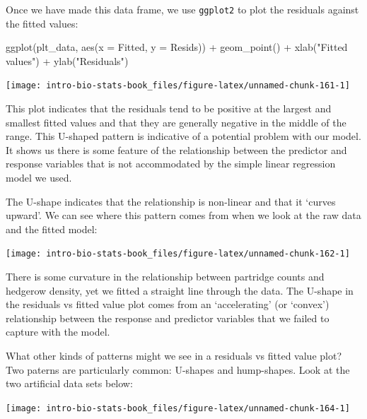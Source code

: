 \documentclass[
]{book}
\newenvironment{Shaded}{\begin{snugshade}}{\end{snugshade}}
\newcommand{\AttributeTok}[1]{\textcolor[rgb]{0.77,0.63,0.00}{#1}}
\newcommand{\FunctionTok}[1]{\textcolor[rgb]{0.00,0.00,0.00}{#1}}
\newcommand{\NormalTok}[1]{#1}
\newcommand{\SpecialCharTok}[1]{\textcolor[rgb]{0.00,0.00,0.00}{#1}}
\newcommand{\StringTok}[1]{\textcolor[rgb]{0.31,0.60,0.02}{#1}}
\begin{document}
Once we have made this data frame, we use \texttt{ggplot2} to plot the residuals against the fitted values:

\begin{Shaded}
\begin{Highlighting}[]
\FunctionTok{ggplot}\NormalTok{(plt\_data, }\FunctionTok{aes}\NormalTok{(}\AttributeTok{x =}\NormalTok{ Fitted, }\AttributeTok{y =}\NormalTok{ Resids)) }\SpecialCharTok{+} 
  \FunctionTok{geom\_point}\NormalTok{() }\SpecialCharTok{+} 
  \FunctionTok{xlab}\NormalTok{(}\StringTok{"Fitted values"}\NormalTok{) }\SpecialCharTok{+} \FunctionTok{ylab}\NormalTok{(}\StringTok{"Residuals"}\NormalTok{)}
\end{Highlighting}
\end{Shaded}

\begin{center}\texttt{[image: intro-bio-stats-book\_files/figure-latex/unnamed-chunk-161-1]} \end{center}

This plot indicates that the residuals tend to be positive at the largest and smallest fitted values and that they are generally negative in the middle of the range. This U-shaped pattern is indicative of a potential problem with our model. It shows us there is some feature of the relationship between the predictor and response variables that is not accommodated by the simple linear regression model we used.

The U-shape indicates that the relationship is non-linear and that it `curves upward'. We can see where this pattern comes from when we look at the raw data and the fitted model:

\begin{center}\texttt{[image: intro-bio-stats-book\_files/figure-latex/unnamed-chunk-162-1]} \end{center}

There is some curvature in the relationship between partridge counts and hedgerow density, yet we fitted a straight line through the data. The U-shape in the residuals vs fitted value plot comes from an `accelerating' (or `convex') relationship between the response and predictor variables that we failed to capture with the model.

What other kinds of patterns might we see in a residuals vs fitted value plot? Two paterns are particularly common: U-shapes and hump-shapes. Look at the two artificial data sets below:

\begin{center}\texttt{[image: intro-bio-stats-book\_files/figure-latex/unnamed-chunk-164-1]} \end{center}
\end{document}

